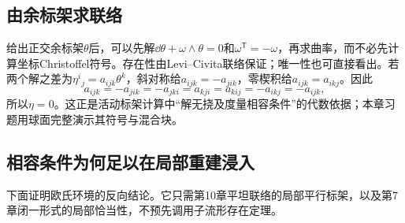 \subsection*{由余标架求联络}
给出正交余标架$\theta$后，可以先解$\dd\theta+\omega\wedge\theta=0$和$\omega^{\mathsf T}=-\omega$，再求曲率，而不必先计算坐标Christoffel符号。存在性由Levi--Civita联络保证；唯一性也可直接看出。若两个解之差为$\eta^i{}_j=a_{ijk}\theta^k$，斜对称给$a_{ijk}=-a_{jik}$，零楔积给$a_{ijk}=a_{ikj}$。因此
\[
 a_{ijk}=-a_{jik}=-a_{jki}=a_{kji}=a_{kij}=-a_{ikj}=-a_{ijk},
\]
所以$\eta=0$。这正是活动标架计算中“解无挠及度量相容条件”的代数依据；本章习题用球面完整演示其符号与混合块。

\subsection*{相容条件为何足以在局部重建浸入}
下面证明欧氏环境的反向结论。它只需第10章平坦联络的局部平行标架，以及第7章闭一形式的局部恰当性，不预先调用子流形存在定理。

